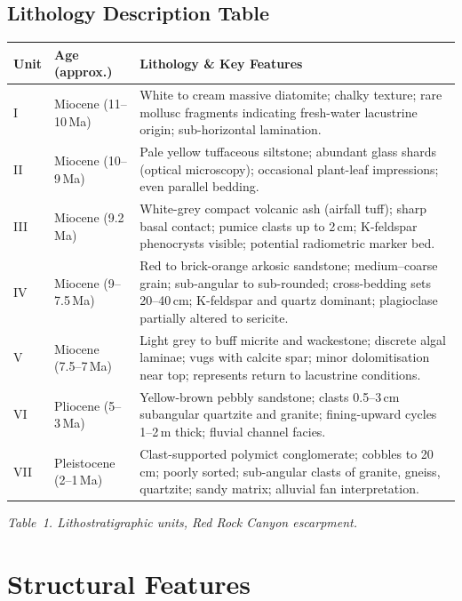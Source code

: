 \documentclass[11pt,a4paper]{article}
\begin{document}
\subsection{Lithology Description Table}

\begin{tabularx}{\linewidth}{@{} l l >{\raggedright\arraybackslash}X @{}}
\toprule
\textbf{Unit} & \textbf{Age (approx.)} & \textbf{Lithology \& Key Features} \\
\midrule
I   & Miocene (11--10\,Ma)  & White to cream massive diatomite; chalky texture; rare mollusc fragments indicating fresh-water lacustrine origin; sub-horizontal lamination. \\
\addlinespace[2pt]
II  & Miocene (10--9\,Ma)   & Pale yellow tuffaceous siltstone; abundant glass shards (optical microscopy); occasional plant-leaf impressions; even parallel bedding. \\
\addlinespace[2pt]
III & Miocene (9.2\,Ma)    & White-grey compact volcanic ash (airfall tuff); sharp basal contact; pumice clasts up to 2\,cm; K-feldspar phenocrysts visible; potential radiometric marker bed. \\
\addlinespace[2pt]
IV  & Miocene (9--7.5\,Ma)  & Red to brick-orange arkosic sandstone; medium--coarse grain; sub-angular to sub-rounded; cross-bedding sets 20--40\,cm; K-feldspar and quartz dominant; plagioclase partially altered to sericite. \\
\addlinespace[2pt]
V   & Miocene (7.5--7\,Ma)  & Light grey to buff micrite and wackestone; discrete algal laminae; vugs with calcite spar; minor dolomitisation near top; represents return to lacustrine conditions. \\
\addlinespace[2pt]
VI  & Pliocene (5--3\,Ma)   & Yellow-brown pebbly sandstone; clasts 0.5--3\,cm subangular quartzite and granite; fining-upward cycles 1--2\,m thick; fluvial channel facies. \\
\addlinespace[2pt]
VII & Pleistocene (2--1\,Ma) & Clast-supported polymict conglomerate; cobbles to 20\,cm; poorly sorted; sub-angular clasts of granite, gneiss, quartzite; sandy matrix; alluvial fan interpretation. \\
\bottomrule
\end{tabularx}
\vspace{3pt}
{\small\itshape\color{stone}Table~1. Lithostratigraphic units, Red Rock Canyon escarpment.}

\section{Structural Features}
\end{document}

